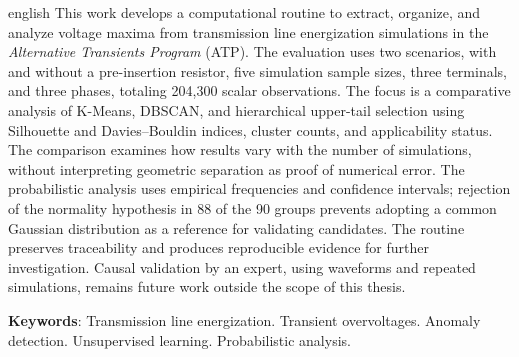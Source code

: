 \begin{resumo}[Abstract]
\begin{otherlanguage*}{english}
This work develops a computational routine to extract, organize, and analyze
voltage maxima from transmission line energization simulations in the
\textit{Alternative Transients Program} (ATP). The evaluation uses two
scenarios, with and without a pre-insertion resistor, five simulation sample
sizes, three terminals, and three phases, totaling 204,300 scalar
observations. The focus is a comparative analysis of K-Means, DBSCAN, and
hierarchical upper-tail selection using Silhouette and Davies--Bouldin
indices, cluster counts, and applicability status. The comparison examines
how results vary with the number of simulations, without interpreting
geometric separation as proof of numerical error. The probabilistic
analysis uses empirical frequencies and confidence intervals; rejection of
the normality hypothesis in 88 of the 90 groups prevents adopting a common
Gaussian distribution as a reference for validating candidates. The routine
preserves traceability and produces reproducible evidence for further
investigation. Causal validation by an expert, using waveforms and repeated
simulations, remains future work outside the scope of this thesis.

\vspace{\onelineskip}
\noindent
\textbf{Keywords}: Transmission line energization. Transient overvoltages.
Anomaly detection. Unsupervised learning. Probabilistic analysis.
\end{otherlanguage*}
\end{resumo}
